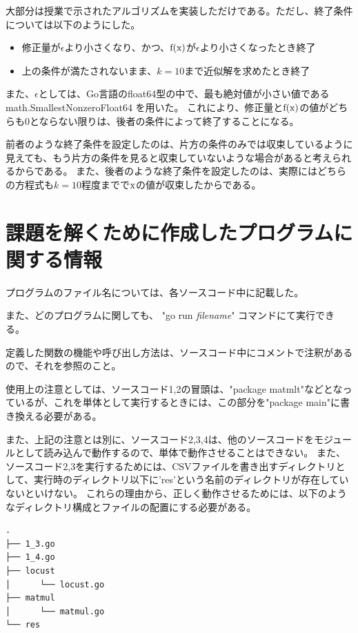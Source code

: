 \documentclass[11pt]{ltjsarticle}
\begin{document}
	大部分は授業で示されたアルゴリズムを実装しただけである。ただし、終了条件については以下のようにした。
	
	\begin{itemize}
		\item 修正量が$\epsilon$より小さくなり、かつ、${\rm f(x)}$が$\epsilon$より小さくなったとき終了
		\item 上の条件が満たされないまま、$k=10$まで近似解を求めたとき終了
	\end{itemize}
	
	また、$\epsilon$としては、Go言語のfloat64型の中で、最も絶対値が小さい値である math.SmallestNonzeroFloat64 を用いた。
	これにより、修正量と${\rm f(x)}$の値がどちらも$0$とならない限りは、後者の条件によって終了することになる。
	
	前者のような終了条件を設定したのは、片方の条件のみでは収束しているように見えても、もう片方の条件を見ると収束していないような場合があると考えられるからである。
	また、後者のような終了条件を設定したのは、実際にはどちらの方程式も$k=10$程度までで${\rm x}$の値が収束したからである。

\section{課題を解くために作成したプログラムに関する情報}
	プログラムのファイル名については、各ソースコード中に記載した。
	
	また、どのプログラムに関しても、 "go run {\it filename}" コマンドにて実行できる。

	定義した関数の機能や呼び出し方法は、ソースコード中にコメントで注釈があるので、それを参照のこと。
	
	使用上の注意としては、ソースコード1,2の冒頭は、"package matmlt"などとなっているが、これを単体として実行するときには、この部分を"package main"に書き換える必要がある。
	
	また、上記の注意とは別に、ソースコード2,3,4は、他のソースコードをモジュールとして読み込んで動作するので、単体で動作させることはできない。
	また、ソースコード2,3を実行するためには、CSVファイルを書き出すディレクトリとして、実行時のディレクトリ以下に'res'という名前のディレクトリが存在していないといけない。
	これらの理由から、正しく動作させるためには、以下のようなディレクトリ構成とファイルの配置にする必要がある。
	
\begin{verbatim}
.
├── 1_3.go
├── 1_4.go
├── locust
│      └── locust.go
├── matmul
│      └── matmul.go
└── res
\end{verbatim}
\end{document}
